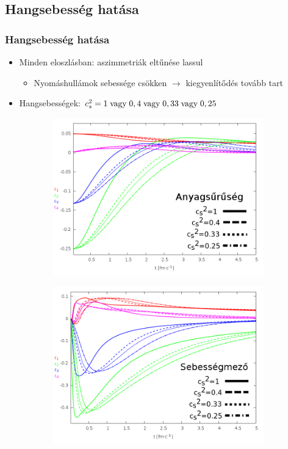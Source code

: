 \documentclass{beamer}
\begin{document}
\subsection{Hangsebesség hatása}
\begin{frame}
\frametitle{Hangsebesség hatása}
\begin{center}
\begin{itemize}
\setlength{\itemsep}{12pt}
\item<1-> Minden eloszlásban: aszimmetriák eltűnése lassul
\vspace{8pt}
\begin{itemize}
\item<1-> Nyomáshullámok sebessége csökken $\rightarrow$ kiegyenlítődés tovább tart
\end{itemize}
\item Hangsebességek: $c_s^2=1\; \rm{vagy}\;0,4\; \rm{vagy}\; \rm{0,33}\; vagy\; \rm{0,25}$
\end{itemize}
\begin{figure}[H]
	\centering
    \begin{subfigure}[b]{0.49\textwidth}
    		\includegraphics[width=\textwidth]{pic/res/nonrel/eps_cs2_r}
	\end{subfigure}
	\begin{subfigure}[b]{0.49\textwidth}
        	\includegraphics[width=\textwidth]{pic/res/nonrel/eps_cs2_v}

\end{subfigure}
\end{figure}
\end{center}
\end{frame}
\end{document}
